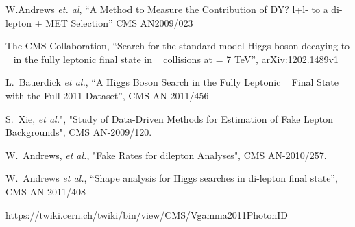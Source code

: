 \begin{thebibliography}{99}

W.Andrews {\it et. al}, ``A Method to Measure the Contribution of DY? l+l- to a di-lepton + MET Selection''
CMS AN2009/023

  The CMS Collaboration, ``Search for the standard model Higgs boson decaying to \wwpm~ in the fully leptonic ﬁnal state in \PP~ collisions at \sqrts= 7 TeV'',
  arXiv:1202.1489v1 
     
  L.~Bauerdick {\it et al.}, ``A Higgs Boson Search in the Fully Leptonic \wwpm~ Final State with the Full 2011 Dataset'',
  CMS AN-2011/456 

S.~Xie, \textit{et al.}", "Study of Data-Driven Methods for Estimation of Fake Lepton Backgrounds", 
CMS AN-2009/120.

W.~Andrews, \textit{et al.}, "Fake Rates for dilepton Analyses", CMS AN-2010/257.

  W.~Andrews {\it et al.}, ``Shape analysis for Higgs searches in di-lepton final state'',
  CMS AN-2011/408

  https://twiki.cern.ch/twiki/bin/view/CMS/Vgamma2011PhotonID

\end{thebibliography}


